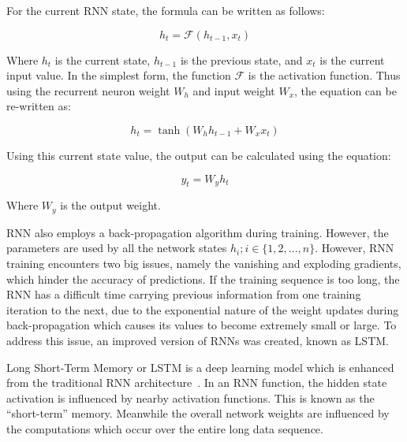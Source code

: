 For the current RNN state, the formula can be written as follows:

\begin{equation}
    h_{t} = \mathcal{F}(h_{t-1}, x_{t})
\end{equation}

Where $h_{t}$ is the current state, $h_{t-1}$ is the previous state, and $x_{t}$ is the current input value. In the simplest form, the function $\mathcal{F}$ is the activation function. Thus using the recurrent neuron weight $W_{h}$ and input weight $W_{x}$, the equation can be re-written as:

\begin{equation}
    h_{t} = \tanh(W_{h}h_{t-1} + W_{x}x_{t})
\end{equation}

Using this current state value, the output can be calculated using the equation:

\begin{equation}
    y_{t} = W_{y}h_{t}
\end{equation}

Where $W_{y}$ is the output weight.\par

RNN also employs a back-propagation algorithm during training. However, the parameters are used by all the network states $h_{i}; i \in \{1, 2, ... , n\}$. However, RNN training encounters two big issues, namely the vanishing and exploding gradients, which hinder the accuracy of predictions. If the training sequence is too long, the RNN has a difficult time carrying previous information from one training iteration to the next, due to the exponential nature of the weight updates during back-propagation which causes its values to become extremely small or large. To address this issue, an improved version of RNNs was created, known as LSTM.\par

Long Short-Term Memory or LSTM is a deep learning model which is enhanced from the traditional RNN architecture~\cite{lindemann2021survey}. In an RNN function, the hidden state activation is influenced by nearby activation functions. This is known as the ``short-term'' memory. Meanwhile the overall network weights are influenced by the computations which occur over the entire long data sequence.\par

